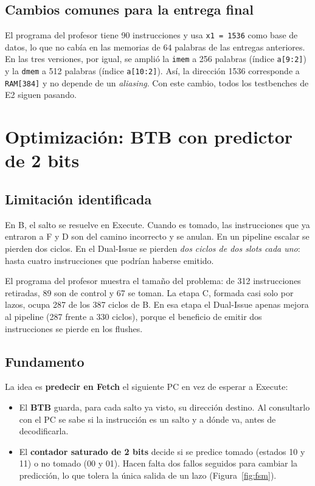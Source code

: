 \documentclass[11pt,a4paper]{article}
\newcommand{\sig}[1]{\texttt{#1}}
\begin{document}
\subsection{Cambios comunes para la entrega final}

El programa del profesor tiene 90 instrucciones y usa \sig{x1~=~1536} como base de datos, lo que no cabía en las memorias de 64 palabras de las entregas anteriores. En las tres versiones, por igual, se amplió la \sig{imem} a 256 palabras (índice \sig{a[9:2]}) y la \sig{dmem} a 512 palabras (índice \sig{a[10:2]}). Así, la dirección 1536 corresponde a \sig{RAM[384]} y no depende de un \emph{aliasing}. Con este cambio, todos los testbenches de E2 siguen pasando.

\section{Optimización: BTB con predictor de 2 bits}

\subsection{Limitación identificada}

En B, el salto se resuelve en Execute. Cuando es tomado, las instrucciones que ya entraron a F y D son del camino incorrecto y se anulan. En un pipeline escalar se pierden dos ciclos. En el Dual-Issue se pierden \emph{dos ciclos de dos slots cada uno}: hasta cuatro instrucciones que podrían haberse emitido.

El programa del profesor muestra el tamaño del problema: de 312 instrucciones retiradas, 89 son de control y 67 se toman. La etapa C, formada casi solo por lazos, ocupa 287 de los 387 ciclos de B. En esa etapa el Dual-Issue apenas mejora al pipeline (287 frente a 330 ciclos), porque el beneficio de emitir dos instrucciones se pierde en los flushes.

\subsection{Fundamento}

La idea es \textbf{predecir en Fetch} el siguiente PC en vez de esperar a Execute:
\begin{itemize}[nosep]
  \item El \textbf{BTB} guarda, para cada salto ya visto, su dirección destino. Al consultarlo con el PC se sabe si la instrucción es un salto y a dónde va, antes de decodificarla.
  \item El \textbf{contador saturado de 2 bits} decide si se predice tomado (estados 10 y 11) o no tomado (00 y 01). Hacen falta dos fallos seguidos para cambiar la predicción, lo que tolera la única salida de un lazo (Figura~\ref{fig:fsm}).
\end{itemize}
\end{document}
